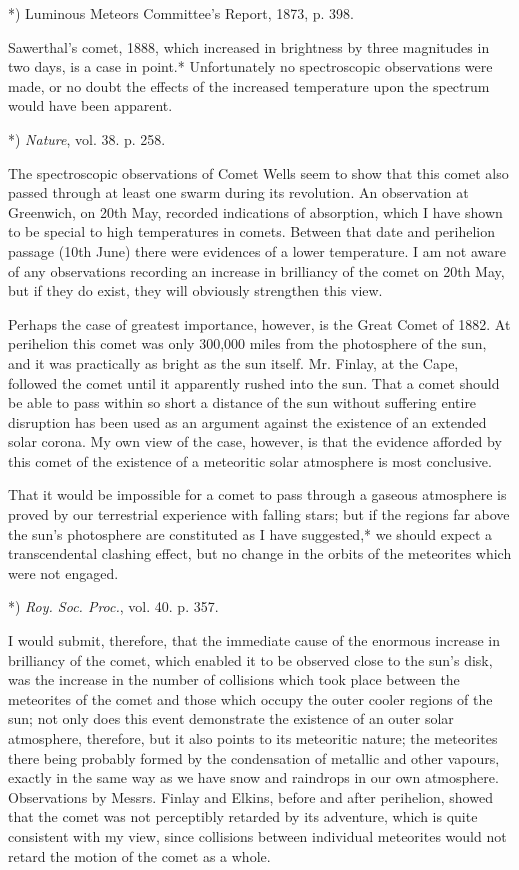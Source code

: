 \documentclass[a4paper, 12pt, oneside, polutonikogreek, english]{article}
\begin{document}
*) Luminous Meteors Committee's Report, 1873, p. 398.

Sawerthal's comet, 1888, which increased in brightness by three magnitudes in two days, is a case in point.* Unfortunately no spectroscopic observations were made, or no doubt the effects of the increased temperature upon the spectrum would have been apparent.

*) \emph{Nature}, vol. 38. p. 258.

The spectroscopic observations of Comet Wells seem to show that this comet also passed through at least one swarm during its revolution. An observation at Greenwich, on 20th May, recorded indications of absorption, which I have shown to be special to high temperatures in comets. Between that date and perihelion passage (10th June) there were evidences of a lower temperature. I am not aware of any observations recording an increase in brilliancy of the comet on 20th May, but if they do exist, they will obviously strengthen this view.

Perhaps the case of greatest importance, however, is the Great Comet of 1882. At perihelion this comet was only 300,000 miles from the photosphere of the sun, and it was practically as bright as the sun itself. Mr. Finlay, at the Cape, followed the comet until it apparently rushed into the sun. That a comet should be able to pass within so short a distance of the sun without suffering entire disruption has been used as an argument against the existence of an extended solar corona. My own view of the case, however, is that the evidence afforded by this comet of the existence of a meteoritic solar atmosphere is most conclusive.

That it would be impossible for a comet to pass through a gaseous atmosphere is proved by our terrestrial experience with falling stars; but if the regions far above the sun's photosphere are constituted as I have suggested,* we should expect a transcendental clashing effect, but no change in the orbits of the meteorites which were not engaged.

*) \emph{Roy. Soc. Proc.}, vol. 40. p. 357.

I would submit, therefore, that the immediate cause of the enormous increase in brilliancy of the comet, which enabled it to be observed close to the sun's disk, was the increase in the number of collisions which took place between the meteorites of the comet and those which occupy the outer cooler regions of the sun; not only does this event demonstrate the existence of an outer solar atmosphere, therefore, but it also points to its meteoritic nature; the meteorites there being probably formed by the condensation of metallic and other vapours, exactly in the same way as we have snow and raindrops in our own atmosphere. Observations by Messrs. Finlay and Elkins, before and after perihelion, showed that the comet was not perceptibly retarded by its adventure, which is quite consistent with my view, since collisions between individual meteorites would not retard the motion of the comet as a whole.
\end{document}
